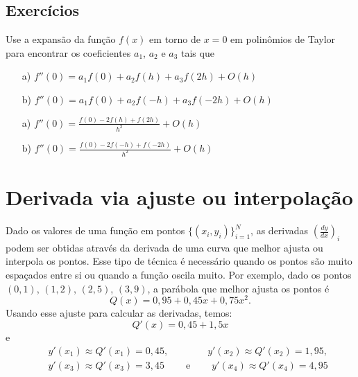 \subsection*{Exercícios}

\begin{exer} Use a expansão da função $f(x)$ em torno de $x=0$ em polinômios de Taylor para encontrar os coeficientes $a_1$, $a_2$ e $a_3$ tais que
\begin{itemize}
\item[a)] $f''(0)=a_1f(0)+a_2f(h)+a_3f(2h) + O(h)$
\item[b)] $f''(0)=a_1f(0)+a_2f(-h)+a_3f(-2h) + O(h)$
\end{itemize}
\end{exer}
\begin{resp}
  
\begin{itemize}
\item[a)] $f''(0)=\frac{f(0)-2f(h)+f(2h)}{h^2}+O(h)$
\item[b)] $f''(0)=\frac{f(0)-2f(-h)+f(-2h)}{h^2}+O(h)$
\end{itemize}    
  
\end{resp}

\section{Derivada via ajuste ou interpolação}

Dado os valores de uma função em pontos $\{(x_i,y_i)\}_{i=1}^N$, as derivadas $\left(\frac{dy}{dx}\right)_i$ podem ser obtidas através da derivada de uma curva que melhor ajusta ou interpola os pontos. Esse tipo de técnica é necessário quando os pontos são muito espaçados entre si ou quando a função oscila muito. Por exemplo, dado os pontos $(0,1)$, $(1,2)$, $(2,5)$, $(3,9)$, a parábola que melhor ajusta os pontos é
$$
Q(x)=0,95 + 0,45x + 0,75x^2.
$$
Usando esse ajuste para calcular as derivadas, temos:
$$
Q'(x)=0,45 + 1,5x
$$
e
\begin{eqnarray*}
&&y'(x_1)\approx Q'(x_1)=0,45, \qquad\qquad y'(x_2)\approx Q'(x_2)=1,95, \\&& y'(x_3)\approx Q'(x_3)=3,45 \qquad ~ \text{e} ~ \qquad y'(x_4)\approx Q'(x_4)=4,95
\end{eqnarray*}

